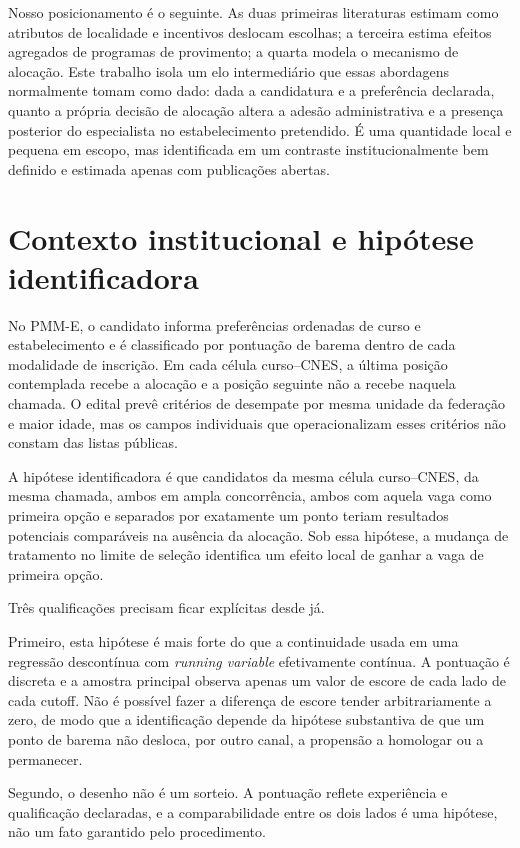 \documentclass[11pt,a4paper]{article}
\begin{document}
Nosso posicionamento é o seguinte. As duas primeiras literaturas estimam como
atributos de localidade e incentivos deslocam escolhas; a terceira estima efeitos
agregados de programas de provimento; a quarta modela o mecanismo de alocação.
Este trabalho isola um elo intermediário que essas abordagens normalmente tomam
como dado: dada a candidatura e a preferência declarada, quanto a própria decisão
de alocação altera a adesão administrativa e a presença posterior do
especialista no estabelecimento pretendido. É uma quantidade local e pequena em
escopo, mas identificada em um contraste institucionalmente bem definido e
estimada apenas com publicações abertas.

\section{Contexto institucional e hipótese identificadora}
\label{sec:contexto}

No PMM-E, o candidato informa preferências ordenadas de curso e estabelecimento
e é classificado por pontuação de barema dentro de cada modalidade de inscrição.
Em cada célula curso--CNES, a última posição contemplada recebe a alocação e a
posição seguinte não a recebe naquela chamada. O edital prevê critérios de
desempate por mesma unidade da federação e maior idade, mas os campos
individuais que operacionalizam esses critérios não constam das listas públicas.

A hipótese identificadora é que candidatos da mesma célula curso--CNES, da mesma
chamada, ambos em ampla concorrência, ambos com aquela vaga como primeira opção
e separados por exatamente um ponto teriam resultados potenciais comparáveis na
ausência da alocação. Sob essa hipótese, a mudança de tratamento no limite de
seleção identifica um efeito local de ganhar a vaga de primeira opção.

Três qualificações precisam ficar explícitas desde já.

Primeiro, esta hipótese é mais forte do que a continuidade usada em uma
regressão descontínua com \emph{running variable} efetivamente contínua. A
pontuação é discreta e a amostra principal observa apenas um valor de escore de
cada lado de cada cutoff. Não é possível fazer a diferença de escore tender
arbitrariamente a zero, de modo que a identificação depende da hipótese
substantiva de que um ponto de barema não desloca, por outro canal, a propensão
a homologar ou a permanecer.

Segundo, o desenho não é um sorteio. A pontuação reflete experiência e
qualificação declaradas, e a comparabilidade entre os dois lados é uma hipótese,
não um fato garantido pelo procedimento.
\end{document}

